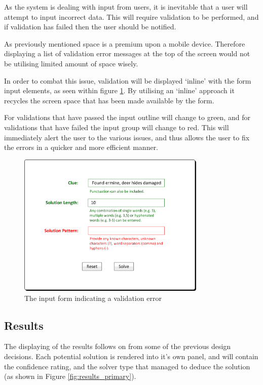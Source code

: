 As the system is dealing with input from users, it is inevitable that a user 
will attempt to input incorrect data. This will require validation to be 
performed, and if validation has failed then the user should be notified. 

As previously mentioned space is a premium upon a mobile device. Therefore 
displaying a list of validation error messages at the top of the screen would 
not be utilising limited amount of space wisely.

In order to combat this issue, validation will be displayed `inline' with the 
form input elements, as seen within figure \ref{fig:input_form_error}. By 
utilising an `inline' approach it recycles the screen space that has been made 
available by the form.

For validations that have passed the input outline will change to green, and for
validations that have failed the input group will change to red. This will 
immediately alert the user to the various issues, and thus allows the user to 
fix the errors in a quicker and more efficient manner.

\begin{figure}[H]
  \centering
  \includegraphics[width=0.8\textwidth]{ui/form_error.jpg}
  \caption{The input form indicating a validation error}
  \label{fig:input_form_error}
\end{figure}


\subsection{Results} 
\label{sub:results}

The displaying of the results follows on from some of the previous design 
decisions. Each potential solution is rendered into it's own panel, and will 
contain the confidence rating, and the solver type that managed to deduce the 
solution (as shown in Figure \ref{fig:results_primary}).

